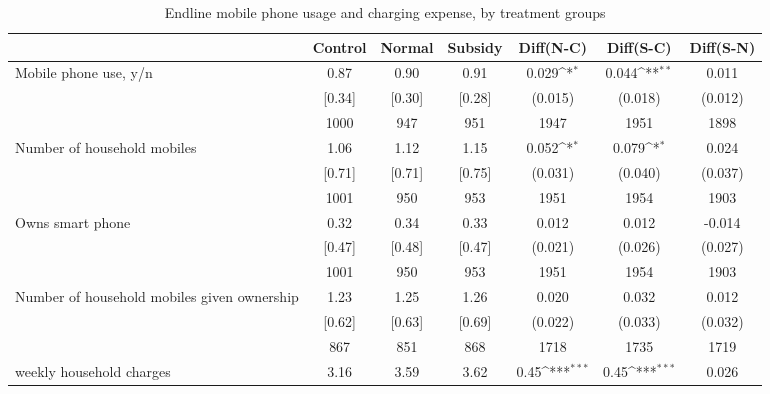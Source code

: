 \begin{table}[htbp]\centering
\def\sym#1{\ifmmode^{#1}\else\(^{#1}\)\fi}
\caption{Endline mobile phone usage and charging expense, by treatment groups \label{tab:"balance"}}
\begin{tabular*}{1\hsize}{@{\hskip\tabcolsep\extracolsep\fill}l*{1}{cccccc}}
\toprule
                                &  Control&   Normal&  Subsidy&Diff(N-C)         &Diff(S-C)         &Diff(S-N)         \\
\midrule
Mobile phone use, y/n           &     0.87&     0.90&     0.91&    0.029\sym{*}  &    0.044\sym{**} &    0.011         \\
                                &   [0.34]&   [0.30]&   [0.28]&  (0.015)         &  (0.018)         &  (0.012)         \\
                                &     1000&      947&      951&     1947         &     1951         &     1898         \\
Number of household mobiles     &     1.06&     1.12&     1.15&    0.052\sym{*}  &    0.079\sym{*}  &    0.024         \\
                                &   [0.71]&   [0.71]&   [0.75]&  (0.031)         &  (0.040)         &  (0.037)         \\
                                &     1001&      950&      953&     1951         &     1954         &     1903         \\
Owns smart phone                &     0.32&     0.34&     0.33&    0.012         &    0.012         &   -0.014         \\
                                &   [0.47]&   [0.48]&   [0.47]&  (0.021)         &  (0.026)         &  (0.027)         \\
                                &     1001&      950&      953&     1951         &     1954         &     1903         \\
Number of household mobiles given ownership&     1.23&     1.25&     1.26&    0.020         &    0.032         &    0.012         \\
                                &   [0.62]&   [0.63]&   [0.69]&  (0.022)         &  (0.033)         &  (0.032)         \\
                                &      867&      851&      868&     1718         &     1735         &     1719         \\
weekly household charges        &     3.16&     3.59&     3.62&     0.45\sym{***}&     0.45\sym{***}&    0.026         \\

\end{tabular*}
\end{table}
